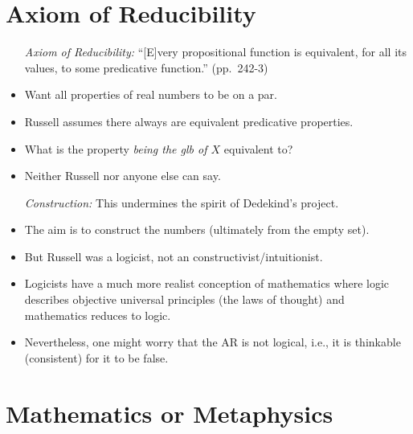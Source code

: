 \documentclass[a4paper, 11pt]{article} %
\begin{document}
\section*{Axiom of Reducibility}

\begin{itemize}
  \item[\it Axiom of Reducibility:] ``[E]very propositional function is equivalent, for all its values, to some predicative function.'' (pp.~242-3)
    \item Want all properties of real numbers to be on a par.
    \item Russell assumes there always are equivalent predicative properties.
    \item What is the property \textit{being the glb of $X$} equivalent to?
    \item Neither Russell nor anyone else can say.
  \item[\it Construction:] This undermines the spirit of Dedekind's project.
    \item The aim is to construct the numbers (ultimately from the empty set).
    \item But Russell was a logicist, not an constructivist/intuitionist.
    \item Logicists have a much more realist conception of mathematics where logic describes objective universal principles (the laws of thought) and mathematics reduces to logic.
    \item Nevertheless, one might worry that the AR is not logical, i.e., it is thinkable (consistent) for it to be false.
\end{itemize}



\section*{Mathematics or Metaphysics}
\end{document}
